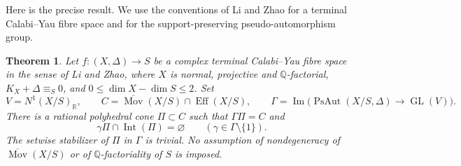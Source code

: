 \documentclass[11pt]{article}
\newtheorem{theorem}{Theorem}
\DeclareMathOperator{\Eff}{Eff}
\DeclareMathOperator{\Mov}{Mov}
\DeclareMathOperator{\Int}{Int}
\DeclareMathOperator{\PsAut}{PsAut}
\begin{document}
Here is the precise result. We use the conventions of Li and Zhao for a terminal
Calabi--Yau fibre space and for the support-preserving pseudo-automorphism group.

\begin{theorem}\label{thm:main}
Let $f\colon(X,\Delta)\to S$ be a complex terminal Calabi--Yau fibre space in the sense of Li and Zhao, where $X$ is normal, projective and $\mathbb Q$-factorial, $K_X+\Delta\equiv_S0$, and $0\leq\dim X-\dim S\leq2$. Set
\[
 V=N^1(X/S)_{\mathbb R},\qquad
 C=\overline{\Mov}(X/S)\cap\Eff(X/S),\qquad
 \Gamma=\operatorname{Im}\bigl(\PsAut(X/S,\Delta)\longrightarrow\operatorname{GL}(V)\bigr).
\]
There is a rational polyhedral cone $\Pi\subset C$ such that $\Gamma\Pi=C$ and
\[
 \gamma\Pi\cap\Int(\Pi)=\varnothing\qquad(\gamma\in\Gamma\setminus\{1\}).
\]
The setwise stabilizer of $\Pi$ in $\Gamma$ is trivial. No assumption of nondegeneracy of $\overline{\Mov}(X/S)$ or of $\mathbb Q$-factoriality of $S$ is imposed.
\end{theorem}
\end{document}
